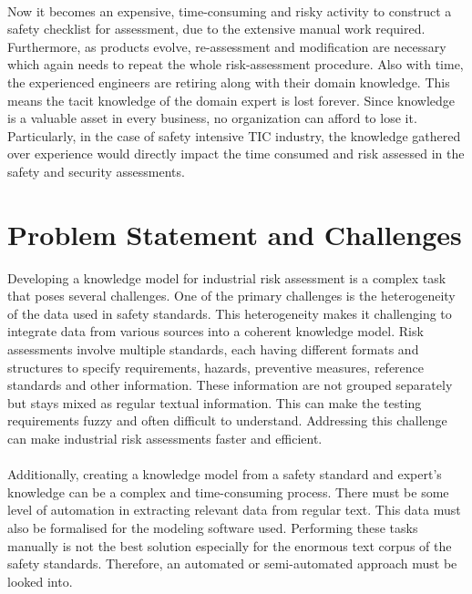 \paragraph{} Now it becomes an expensive, time-consuming and risky activity to construct a safety checklist for assessment, due to the extensive manual work required. Furthermore, as products evolve, re-assessment and modification are necessary which again needs to repeat the whole risk-assessment procedure. Also with time, the experienced engineers are retiring along with their domain knowledge. This means the tacit knowledge of the domain expert is lost forever. Since knowledge is a valuable asset in every business, no organization can afford to lose it. Particularly, in the case of safety intensive TIC industry, the knowledge gathered over experience would directly impact the time consumed and risk assessed in the safety and security assessments.

\section{Problem Statement and Challenges}\label{problem}
Developing a knowledge model for industrial risk assessment is a complex task that poses several challenges. One of the primary challenges is the heterogeneity of the data used in safety standards. This heterogeneity makes it challenging to integrate data from various sources into a coherent knowledge model. Risk assessments involve multiple standards, each having different formats and structures to specify requirements, hazards, preventive measures, reference standards and other information. These information are not grouped separately but stays mixed as regular textual information. This can make the testing requirements fuzzy and often difficult to understand. Addressing this challenge can make industrial risk assessments faster and efficient.

\paragraph{} Additionally, creating a knowledge model from a safety standard and expert's knowledge can be a complex and time-consuming process. There must be some level of automation in extracting relevant data from regular text. This data must also be formalised for the modeling software used. Performing these tasks manually is not the best solution especially for the enormous text corpus of the safety standards. Therefore, an automated or semi-automated approach must be looked into.


